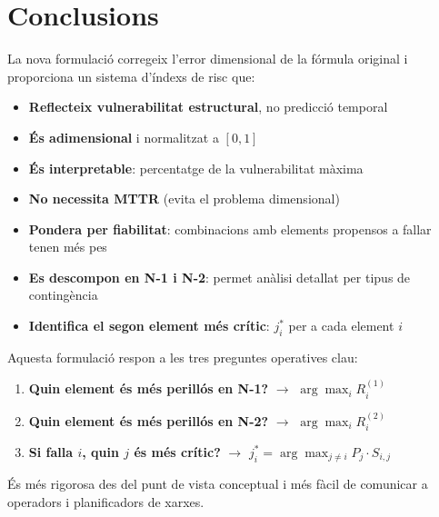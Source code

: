 \documentclass[11pt,a4paper]{article}
\begin{document}
\section{Conclusions}

La nova formulació corregeix l'error dimensional de la fórmula original i proporciona un sistema d'índexs de risc que:

\begin{itemize}
    \item \textbf{Reflecteix vulnerabilitat estructural}, no predicció temporal
    \item \textbf{És adimensional} i normalitzat a $[0, 1]$
    \item \textbf{És interpretable}: percentatge de la vulnerabilitat màxima
    \item \textbf{No necessita MTTR} (evita el problema dimensional)
    \item \textbf{Pondera per fiabilitat}: combinacions amb elements propensos a fallar tenen més pes
    \item \textbf{Es descompon en N-1 i N-2}: permet anàlisi detallat per tipus de contingència
    \item \textbf{Identifica el segon element més crític}: $j^*_i$ per a cada element $i$
\end{itemize}

Aquesta formulació respon a les tres preguntes operatives clau:

\begin{enumerate}
    \item \textbf{Quin element és més perillós en N-1?} $\rightarrow$ $\arg\max_i R_i^{(1)}$
    \item \textbf{Quin element és més perillós en N-2?} $\rightarrow$ $\arg\max_i R_i^{(2)}$
    \item \textbf{Si falla $i$, quin $j$ és més crític?} $\rightarrow$ $j^*_i = \arg\max_{j \neq i} P_j \cdot S_{i,j}$
\end{enumerate}

És més rigorosa des del punt de vista conceptual i més fàcil de comunicar a operadors i planificadors de xarxes.
\end{document}
